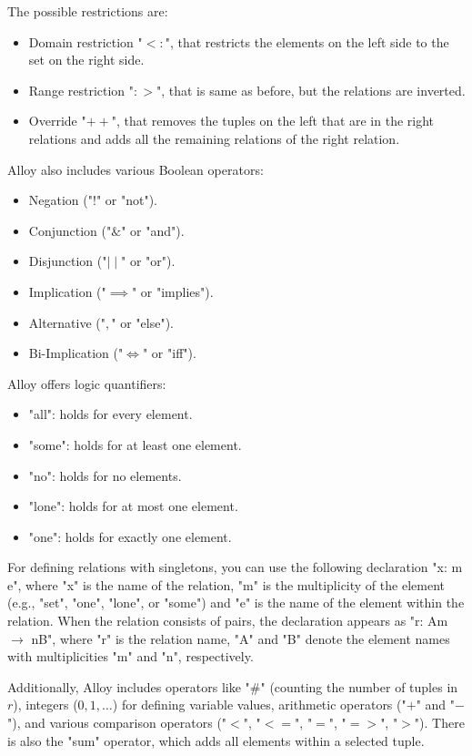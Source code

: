 \documentclass[12pt, a4paper]{report}
\begin{document}
        The possible restrictions are: 
        \begin{itemize}
            \item Domain restriction "$<:$", that restricts the elements on the left side to the set on the right side.
            \item Range restriction "$:>$", that is same as before, but the relations are inverted. 
            \item Override "$++$", that removes the tuples on the left that are in the right relations and adds all the remaining relations of the right relation. 
        \end{itemize}
        Alloy also includes various Boolean operators:
        \begin{itemize}
            \item Negation ("$!$" or "not"). 
            \item Conjunction ("$\&$" or "and"). 
            \item Disjunction ("$\mid \mid$" or "or"). 
            \item Implication ("$\implies$" or "implies"). 
            \item Alternative ("$,$" or "else"). 
            \item Bi-Implication ("$\iff$" or "iff").
        \end{itemize}
        Alloy offers logic quantifiers:
        \begin{itemize}
            \item "all": holds for every element.
            \item "some": holds for at least one element.
            \item "no": holds for no elements.
            \item "lone": holds for at most one element.
            \item "one": holds for exactly one element.
        \end{itemize}
        For defining relations with singletons, you can use the following declaration "x: m e", where "x" is the name of the relation, "m" is the multiplicity of the element (e.g., "set", "one", "lone", or "some") and "e" is the name of the element within the relation. 
        When the relation consists of pairs, the declaration appears as "r: Am $\rightarrow$ nB", where "r" is the relation name, "A" and "B" denote the element names with multiplicities "m" and "n", respectively.
         
        Additionally, Alloy includes operators like "$\#$" (counting the number of tuples in $r$), integers ($0,1,\dots$) for defining variable values, arithmetic operators ("$+$" and "$-$"), and various comparison operators ("$<$", "$<=$", "$=$", "$=>$", "$>$"). 
        There is also the "sum" operator, which adds all elements within a selected tuple.
        
\end{document}
